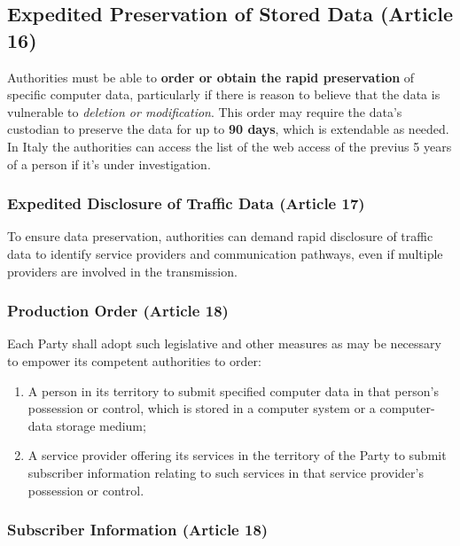 \subsection{Expedited Preservation of Stored Data (Article 16)}

Authorities must be able to \textbf{order or obtain the rapid preservation} of specific computer data, particularly if there is reason to believe that the data is vulnerable to \textit{deletion or modification}. This order may require the data's custodian to preserve the data for up to \textbf{90 days}, which is extendable as needed. \\ In Italy the authorities can access the list of the web access of the previus 5 years of a person if it's under investigation.

\subsubsection{Expedited Disclosure of Traffic Data (Article 17)}

To ensure data preservation, authorities can demand rapid disclosure of traffic data to identify service providers and communication pathways, even if multiple providers are involved in the transmission.

\subsubsection{Production Order (Article 18)}

Each Party shall adopt such legislative and other measures as may be necessary to empower its competent authorities to order:

\begin{enumerate}[itemsep=0pt]
    \item A person in its territory to submit specified computer data in that person’s possession or control, which is stored in a computer system or a computer-data storage medium;
    \item A service provider offering its services in the territory of the Party to submit subscriber information relating to such services in that service provider’s possession or control.
\end{enumerate}

\subsubsection{Subscriber Information (Article 18)}

